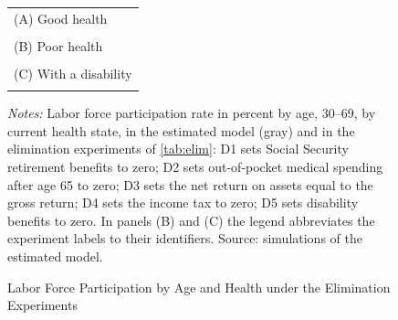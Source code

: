 \begin{figure}[!p]
\centering
\caption{Labor Force Participation by Age and Health under the Elimination Experiments}
\label{fig:elimlfp_health}
\vspace{6pt}
\begin{tabular}{cc}
\multicolumn{2}{l}{\footnotesize (A) Good health}\\
 & \\
\multicolumn{2}{l}{\footnotesize (B) Poor health}\\
 & \\
\multicolumn{2}{l}{\footnotesize (C) With a disability}\\
 & 
\end{tabular}
\begin{minipage}{0.95\textwidth}\footnotesize{}
\textit{Notes:} Labor force participation rate in percent by age, 30--69, by current health state, in the estimated model (gray) and in the elimination experiments of \autoref{tab:elim}: D1 sets Social Security retirement benefits to zero; D2 sets out-of-pocket medical spending after age 65 to zero; D3 sets the net return on assets equal to the gross return; D4 sets the income tax to zero; D5 sets disability benefits to zero. In panels (B) and (C) the legend abbreviates the experiment labels to their identifiers. Source: simulations of the estimated model.
\end{minipage}
\end{figure}

